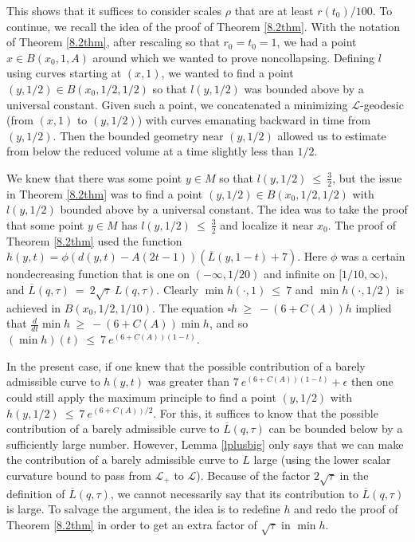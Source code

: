 This shows that it suffices to consider scales $\rho$ that are at
least $r(t_0)/100$.
To continue,
we recall the idea of the proof of Theorem \ref{8.2thm}.
With the notation of Theorem \ref{8.2thm},
after rescaling so that $r_0 = t_0 = 1$,
we had a point $x \in B(x_0, 1, A)$
around which we wanted to prove noncollapsing.  Defining $l$ using curves
starting at $(x, 1)$, we wanted to find a point
$(y, 1/2) \in
B(x_0, 1/2, 1/2)$ so that
$l(y, 1/2)$ was bounded above by a universal constant.  Given such a point,
we concatenated a minimizing ${\mathcal L}$-geodesic (from $(x, 1)$
to $(y, 1/2)$)
with curves emanating backward in time from
$(y, 1/2)$. Then the bounded geometry near $(y, 1/2)$
allowed us
to estimate from below the reduced volume at a time slightly less than
$1/2$.

We knew that there was some point $y \in M$ so that
$l(y, 1/2) \: \le \: \frac{3}{2}$, but the issue in
Theorem \ref{8.2thm} was to find
a point $(y, 1/2) \in
B(x_0, 1/2, 1/2)$ with $l(y, 1/2)$ bounded above
by a universal constant. The idea was to take the proof that
some point $y \in M$ has
$l(y, 1/2) \: \le \: \frac{3}{2}$ and localize it near $x_0$.
The proof of Theorem \ref{8.2thm} used the function
$h(y, t) = \phi(d(y, t) - A (2t-1)) (\overline{L}(y, 1-t) + 7)$.
Here $\phi$ was a certain nondecreasing function that is one on $(- \infty,
1/20)$ and infinite on $[1/10, \infty)$, and
$\overline{L}(q, \tau) \: = \: 2 \sqrt{\tau} \: L(q, \tau)$.
Clearly $\min h(\cdot, 1) \: \le \: 7$ and $\min h(\cdot, 1/2)$ is
achieved in $B(x_0, 1/2, 1/10)$. The equation
$\square h \: \ge \: - (6+ C(A)) h$ implied that
$\frac{d}{dt} \min h \: \ge \: -(6 + C(A)) \min h$, and so
$(\min h)(t) \: \le \:
7 \: e^{(6+C(A))(1-t)}$.

In the present case,
if one knew that the possible contribution of a barely admissible curve to
$h(y, t)$ was greater than $7 \: e^{(6+C(A))(1-t)} + \epsilon$
then one could still apply the maximum principle to find a point $(y, 1/2)$
with $h(y, 1/2) \: \le \: 7 \: e^{(6+C(A))/2}$.
For this, it
suffices to know that the possible contribution of a barely admissible curve
to $\overline{L}(q, \tau)$ can be bounded below by a sufficiently large
number.  However, Lemma \ref{lplusbig}  only says that we can make the
contribution of a barely admissible curve to $L$ large
(using the lower scalar curvature bound to pass from
${\mathcal L}_+$ to ${\mathcal L}$).
Because of the factor $2 \sqrt{\tau}$ in the definition of
$\overline{L}(q, \tau)$, we cannot necessarily say that its contribution
to $\overline{L}(q, \tau)$ is large. To salvage the argument,
the idea is to redefine $h$ and
redo the proof of Theorem \ref{8.2thm} in order to get an extra factor
of $\sqrt{\tau}$ in $\min h$.

